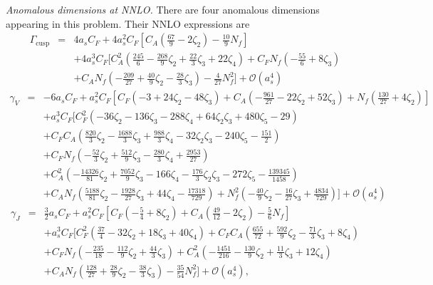 \documentclass[aps,prl,twocolumn,secnumarabic,notitlepage,superscriptaddress,nofootinbib,tightenlines,floatfix,preprintnumbers]{revtex4-1}
\newcommand{\nn}{\nonumber}
\renewcommand{\(}{\left(}
\renewcommand{\)}{\right)}
\renewcommand{\[}{\left[}
\renewcommand{\]}{\right]}
\begin{document}
\begin{widetext}
\textit{Anomalous dimensions at NNLO.} There are four anomalous dimensions appearing in this problem. Their NNLO expressions are
\begin{eqnarray}\label{a1}
\Gamma_{\text{cusp}}&=&4a_s C_F+4 a_s^2 C_F\[C_A\(\frac{67}{9}-2\zeta_2\)-\frac{10}{9}N_f\]
\\\nn &&
+4a_s^3C_F\Big[C_A^2 \left(\frac{245}{6}-\frac{268 }{9}\zeta_2+\frac{22 }{3}\zeta_3+22 \zeta_4\right)+C_F N_f \left(-\frac{55}{6}+8 \zeta_3\right)
\\\nn &&
+C_A N_f \left(-\frac{209}{27}+\frac{40 }{9}\zeta_2-\frac{28 }{3}\zeta_3\right)-\frac{4}{27}N_f^2\Big]+\mathcal{O}(a_s^4)
\end{eqnarray}
\begin{eqnarray}
\gamma_V&=&
-6a_s C_F+a_s^2 C_F\[C_F
(-3+24\zeta_2-48\zeta_3)+C_A\(-\frac{961}{27}-22\zeta_2+52\zeta_3\) 
+N_f\(\frac{130}{27}+4\zeta_2\)\]
\\\nn &&
+a_s^3C_F\Big[C_F^2 (-36 \zeta_2-136 \zeta_3-288 \zeta_4+64 \zeta_2\zeta_3+480 \zeta_5-29)
\\\nn &&
+C_FC_A \left(\frac{820 }{3}\zeta_2-\frac{1688 }{3}\zeta_3+\frac{988 }{3}\zeta_4-32 \zeta_2\zeta_3-240 \zeta_5-\frac{151}{2}\right)
\\\nn &&
+C_FN_f \left(-\frac{52 }{3}\zeta_2+\frac{512 }{9}\zeta_3-\frac{280 }{3}\zeta_4+\frac{2953}{27}\right)
\\\nn &&
+C_A^2 \left(-\frac{14326 }{81}\zeta_2+\frac{7052 }{9}\zeta_3-166 \zeta_4-\frac{176 }{3}\zeta_2\zeta_3-272 \zeta_5-\frac{139345}{1458}\right)
\\\nn &&
+C_A N_f \left(\frac{5188 }{81}\zeta_2-\frac{1928 }{27}\zeta_3+44 \zeta_4-\frac{17318}{729}\right)+N_f^2 \left(-\frac{40 }{9}\zeta_2-\frac{16 }{27}\zeta_3+\frac{4834}{729}\right)\Big]+\mathcal{O}(a_s^4)
\end{eqnarray}
\begin{eqnarray}
\gamma_J&=&\frac{3}{2}a_s C_F+a_s^2C_F\[C_F\(-\frac{5}{4}+8\zeta_2\)+C_A\(\frac{49}{12}-2\zeta_2\)-\frac{5}{6}N_f\]
\\\nn &&
+a_s^3  C_F \Big[C_F^2 \left(\frac{37}{4}-32 \zeta_2+18 \zeta_3+40 \zeta_4\right)+C_F C_A \left(\frac{655}{72}+\frac{592 }{9}\zeta_2-\frac{71 }{3}\zeta_3+8 \zeta_4\right)
\\\nn &&
+C_F N_f \left(-\frac{235}{18}-\frac{112 }{9}\zeta_2+\frac{44 }{3}\zeta_3\right)+C_A^2 \left(-\frac{1451}{216}-\frac{130 }{9}\zeta_2+\frac{11 }{3}\zeta_3+12 \zeta_4\right)
\\\nn &&
+C_A N_f \left(\frac{128}{27}+\frac{28 }{9}\zeta_2-\frac{38 }{3}\zeta_3\right)-\frac{35}{54}N_f^2\Big]+\mathcal{O}(a_s^4),

\end{eqnarray}
\end{widetext}
\end{document}
